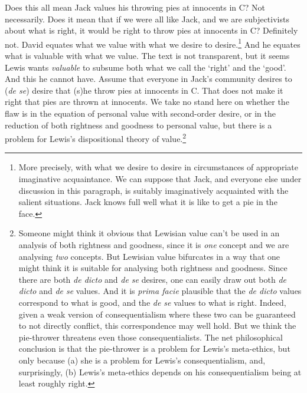 Does this all mean Jack values his throwing pies at innocents in C? Not necessarily. Does it mean that if we were all like Jack, and we are subjectivists about what is right, it would be right to throw pies at innocents in C? Definitely not. David \citet{Lewis1989b} equates what we value with what we desire to desire.\footnote{More precisely, with what we desire to desire in circumstances of appropriate imaginative acquaintance. We can suppose that Jack, and everyone else under discussion in this paragraph, is suitably imaginatively acquainted with the salient situations. Jack knows full well what it is like to get a pie in the face.} And he equates what is valuable with what we value. The text is not transparent, but it seems Lewis wants \textit{valuable} to subsume both what we call the `right' and the `good'. And this he cannot have. Assume that everyone in Jack's community desires to (\textit{de se}) desire that (s)he throw pies at innocents in C. That does not make it right that pies are thrown at innocents. We take no stand here on whether the flaw is in the equation of personal value with second-order desire, or in the reduction of both rightness and goodness to personal value, but there is a problem for Lewis's dispositional theory of value.\footnote{Someone might think it obvious that Lewisian value can't be used in an analysis of both rightness and goodness, since it is \textit{one }concept and we are analysing \textit{two} concepts. But Lewisian value bifurcates in a way that one might think it is suitable for analysing both rightness and goodness. Since there are both \textit{de dicto} and \textit{de se} desires, one can easily draw out both \textit{de dicto} and \textit{de se} values. And it is \textit{prima facie} plausible that the \textit{de dicto} values correspond to what is good, and the \textit{de se} values to what is right. Indeed, given a weak version of consequentialism where these two can be guaranteed to not directly conflict, this correspondence may well hold. But we think the pie-thrower threatens even those consequentialists. The net philosophical conclusion is that the pie-thrower is a problem for Lewis's meta-ethics, but only because (a) she is a problem for Lewis's consequentialism, and, surprisingly, (b) Lewis's meta-ethics depends on his consequentialism being at least roughly right.}

